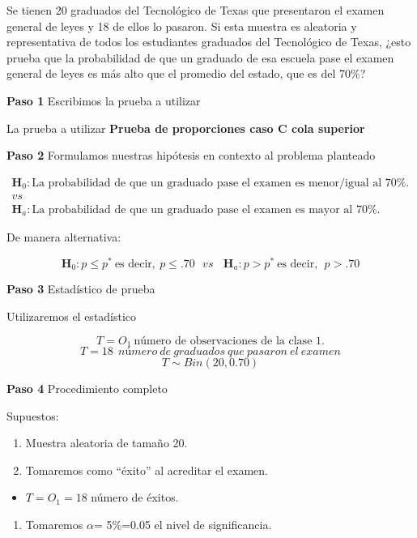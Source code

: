 \documentclass[
  a4paper,
  oneside,
  openany]{book}
\providecommand{\tightlist}{%
  \setlength{\itemsep}{0pt}\setlength{\parskip}{0pt}}
\begin{document}
Se tienen 20 graduados del Tecnológico de Texas que presentaron el examen general de leyes y 18 de ellos lo pasaron. Si esta muestra es aleatoria y representativa de todos los estudiantes graduados del Tecnológico de Texas,
¿esto prueba que la probabilidad de que un graduado de esa escuela pase el examen general de leyes es más alto que el promedio del estado, que es del 70\%?

\textbf{Paso 1} Escribimos la prueba a utilizar

La prueba a utilizar \textbf{Prueba de proporciones caso C cola superior}

\textbf{Paso 2} Formulamos nuestras hipótesis en contexto al problema planteado

\[
\begin{array}{c}
\textbf{H}_{0}: \mbox{La probabilidad de que un graduado pase el examen es menor/igual al } 70\%.\\
vs\\
\textbf{H}_{a}: \mbox{La probabilidad de que un graduado pase el examen es mayor al }70\%.
\end{array}
\]

De manera alternativa:

\[\textbf{H}_{0}: p  \leq p^* \ \mbox{es decir},  \ p  \leq .70\ \ \  vs \ \ \ \ \textbf{H}_{a}: p >p^* \ \mbox{es decir}, \ \ p > .70\]

\textbf{Paso 3} Estadístico de prueba

Utilizaremos el estadístico

\[T=O_{1} \ \mbox{número  de  observaciones  de  la clase 1.}\]
\[T=18 \ \ número\ de\ graduados\ que\ pasaron\ el\ examen\]
\[T\sim Bin(20,0.70)\]

\textbf{Paso 4} Procedimiento completo

Supuestos:

\begin{enumerate}
\def\labelenumi{\arabic{enumi}.}
\item
  Muestra aleatoria de tamaño 20.
\item
  Tomaremos como ``éxito'' al acreditar el examen.
\end{enumerate}

\begin{itemize}
\tightlist
\item
  \(T=O_{1}=18\) número de éxitos.
\end{itemize}

\begin{enumerate}
\def\labelenumi{\arabic{enumi}.}
\setcounter{enumi}{2}
\tightlist
\item
  Tomaremos \(\alpha\)= 5\%=0.05 el nivel de significancia.
\end{enumerate}
\end{document}
